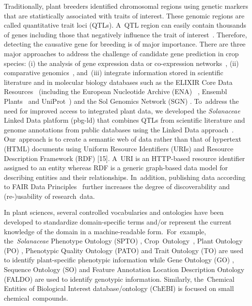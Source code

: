 \documentclass[applsci,article,accept,moreauthors,pdftex]{Definitions/mdpi}
\begin{document}
Traditionally, plant breeders identified chromosomal regions using genetic markers that are statistically associated with traits of interest. These genomic regions are called quantitative trait loci (QTLs). A~QTL region can easily contain thousands of genes including those that negatively influence the trait of interest~\cite{chibon2012marker2sequence}. Therefore, detecting the causative gene for breeding is of major importance. There are three major approaches to address the challenge of candidate gene prediction in crop species: (i) the analysis of gene expression data or co-expression networks~\cite{astola2014inferring}, (ii) comparative genomics~\cite{shinozuka2012quantitative}, and~(iii) integrate information stored in scientific literature and in molecular biology databases such as the ELIXIR Core Data Resources~\cite{durinx2016identifying} (including the European Nucleotide Archive (ENA) %
~\cite{harrison2018european}, Ensembl Plants~\cite{bolser2017ensembl} and UniProt~\cite{TheUniProtConsortium}) and the Sol Genomics Network (SGN) \cite{mueller2005sol}. To~address the need for improved access to integrated plant data, we developed the \textit{Solanaceae} Linked Data platform (pbg-ld) \cite{pbg-ld} that combines QTLs from scientific literature and genome annotations from public databases using the Linked Data approach~\cite{Berners-Lee2006}. Our~approach is to create a semantic web of data rather than that of hypertext (HTML) documents using Uniform Resource Identifiers (URIs) and Resource Description Framework (RDF) [15]. A~URI is an HTTP-based resource identifier assigned to an entity whereas RDF is a generic graph-based data model for describing entities and their relationships. In~addition, publishing data according to FAIR Data Principles~\cite{wilkinson2016fair} further increases the degree of discoverability and (re-)usability of research~data.

In plant sciences, several controlled vocabularies and ontologies have been developed to standardize domain-specific terms and/or represent the current knowledge of the domain in a machine-readable form.~For~example, the~\textit{Solanaceae} %
Phenotype Ontology (SPTO) \cite{SPTO}, %
Crop~Ontology~\cite{CO}, Plant Ontology (PO) \cite{doi:10.1093/pcp/pcs163}, Phenotypic Quality Ontology (PATO) \cite{Walls2012} and Trait Ontology (TO) \cite{TO} are used to identify plant-specific phenotypic information while Gene Ontology (GO) \cite{GOontology}, Sequence Ontology (SO) \cite{Eilbeck2005} and Feature Annotation Location Description Ontology (FALDO) \cite{Mungall2016} %
are used to identify genotypic information. Similarly, the~Chemical Entities of Biological Interest database/ontology (ChEBI) \cite{Hastings2013} is focused on small chemical~compounds.
\end{document}
